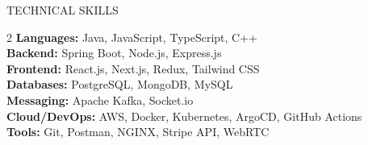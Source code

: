 \documentclass{resume} %
\begin{document}



\begin{rSection}{TECHNICAL SKILLS}
    \begin{multicols}{2}
        \textbf{Languages:} Java, JavaScript, TypeScript, C++ \\
        \textbf{Backend:} Spring Boot, Node.js, Express.js \\
        \textbf{Frontend:} React.js, Next.js, Redux, Tailwind CSS \\
        \textbf{Databases:} PostgreSQL, MongoDB, MySQL\\
        \textbf{Messaging:} Apache Kafka, Socket.io \\
        \textbf{Cloud/DevOps:} AWS, Docker, Kubernetes, ArgoCD, GitHub Actions  \\
        \textbf{Tools:} Git, Postman, NGINX, Stripe API, WebRTC
    \end{multicols}
\end{rSection}
\end{document}
